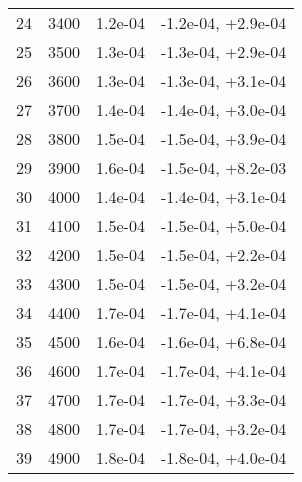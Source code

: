 \begin{table}
\begin{adjustbox}{width=1\textwidth/2}
\begin{tabular}{|c|c|c|c|}
\cline{1-4}
24 & 3400 & 1.2e-04 & -1.2e-04, +2.9e-04 \\
\cline{1-4}
25 & 3500 & 1.3e-04 & -1.3e-04, +2.9e-04 \\
\cline{1-4}
26 & 3600 & 1.3e-04 & -1.3e-04, +3.1e-04 \\
\cline{1-4}
27 & 3700 & 1.4e-04 & -1.4e-04, +3.0e-04 \\
\cline{1-4}
28 & 3800 & 1.5e-04 & -1.5e-04, +3.9e-04 \\
\cline{1-4}
29 & 3900 & 1.6e-04 & -1.5e-04, +8.2e-03 \\
\cline{1-4}
30 & 4000 & 1.4e-04 & -1.4e-04, +3.1e-04 \\
\cline{1-4}
31 & 4100 & 1.5e-04 & -1.5e-04, +5.0e-04 \\
\cline{1-4}
32 & 4200 & 1.5e-04 & -1.5e-04, +2.2e-04 \\
\cline{1-4}
33 & 4300 & 1.5e-04 & -1.5e-04, +3.2e-04 \\
\cline{1-4}
34 & 4400 & 1.7e-04 & -1.7e-04, +4.1e-04 \\
\cline{1-4}
35 & 4500 & 1.6e-04 & -1.6e-04, +6.8e-04 \\
\cline{1-4}
36 & 4600 & 1.7e-04 & -1.7e-04, +4.1e-04 \\
\cline{1-4}
37 & 4700 & 1.7e-04 & -1.7e-04, +3.3e-04 \\
\cline{1-4}
38 & 4800 & 1.7e-04 & -1.7e-04, +3.2e-04 \\
\cline{1-4}
39 & 4900 & 1.8e-04 & -1.8e-04, +4.0e-04 \\
\cline{1-4}
\end{tabular}
\end{adjustbox}
\end{table}

